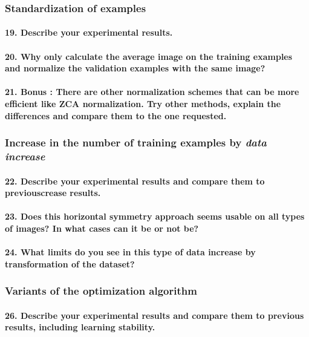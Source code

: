 \documentclass{article}
\theoremstyle{plain}%
\theoremstyle{definition}
\theoremstyle{remark}
\begin{document}
\subsubsection{Standardization of examples}
\paragraph{19. Describe your experimental results.}

\paragraph{20. Why only calculate the average image on the training examples and normalize the validation examples with the same image?}

\paragraph{21. Bonus : There are other normalization schemes that can be more efficient like ZCA normalization. Try other methods, explain the differences and compare them to the one requested.}

\subsubsection{Increase in the number of training examples by \textit{data increase}}
\paragraph{22. Describe your experimental results and compare them to previouscrease results.}

\paragraph{23. Does this horizontal symmetry approach seems usable on all types of images? In what cases can it be or not be?}

\paragraph{24. What limits do you see in this type of data increase by transformation of the dataset?}

\subsubsection{Variants of the optimization algorithm}
\paragraph{26. Describe your experimental results and compare them to previous results, including learning stability.}
\end{document}

